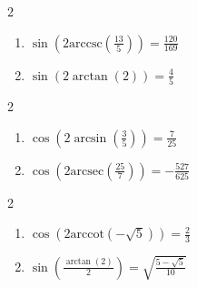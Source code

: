 \documentclass{ximera}
\begin{document}
\begin{multicols}{2}

\begin{enumerate}

\setcounter{enumi}{\value{HW}}

\item  $\sin\left(2\text{arccsc}\left(\frac{13}{5}\right)\right) = \frac{120}{169}$
\item  $\sin\left(2\arctan\left(2\right)\right) = \frac{4}{5}$ 

\setcounter{HW}{\value{enumi}}

\end{enumerate}

\end{multicols}

\begin{multicols}{2}

\begin{enumerate}

\setcounter{enumi}{\value{HW}}

\item  $\cos\left(2 \arcsin\left(\frac{3}{5}\right)\right) = \frac{7}{25}$
\item  $\cos\left(2 \text{arcsec}\left(\frac{25}{7}\right)\right) = -\frac{527}{625}$

\setcounter{HW}{\value{enumi}}

\end{enumerate}

\end{multicols}

\begin{multicols}{2}

\begin{enumerate}

\setcounter{enumi}{\value{HW}}

\item  $\cos\left(2 \text{arccot}\left(-\sqrt{5}\right)\right) = \frac{2}{3}$ 
\item  $\sin\left( \frac{\arctan(2)}{2} \right) = \sqrt{\frac{5-\sqrt{5}}{10}}$ 

\setcounter{HW}{\value{enumi}}

\end{enumerate}

\end{multicols}
\end{document}
